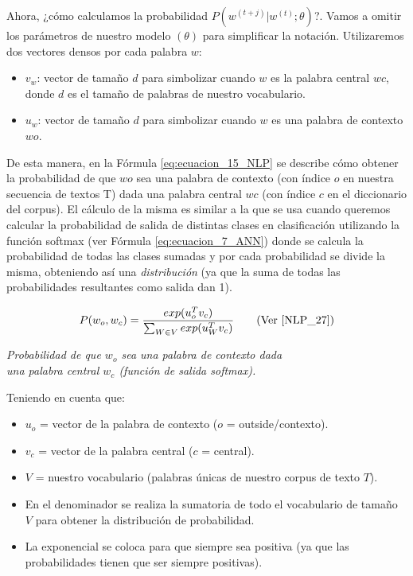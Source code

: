 \documentclass[12pt,a4paper]{article}
\begin{document}
\begin{sloppypar}
Ahora, ¿cómo calculamos la probabilidad $P(w^{(t+j)} | w^{(t)} ; \theta)$?. Vamos a omitir los parámetros de nuestro modelo $(\theta)$ para simplificar la notación. Utilizaremos dos vectores densos por cada palabra $w$:
\begin{itemize}
\item $v_w$: vector de tamaño $d$ para simbolizar cuando $w$ es la palabra central $wc$, donde $d$ es el tamaño de palabras de nuestro vocabulario.
\item $u_w$: vector de tamaño $d$ para simbolizar cuando $w$ es una palabra de contexto $wo$.
\end{itemize}

De esta manera, en la Fórmula \ref{eq:ecuacion_15_NLP} se describe cómo obtener la probabilidad de que $wo$ sea una palabra de contexto (con índice $o$ en nuestra secuencia de textos T) dada una palabra central $wc$ (con índice $c$ en el diccionario del corpus).  El cálculo de la misma es similar a la que se usa cuando queremos calcular la probabilidad de salida de distintas clases en clasificación utilizando la función softmax (ver Fórmula \ref{eq:ecuacion_7_ANN}) donde se calcula la probabilidad de todas las clases sumadas y por cada probabilidad se divide la misma, obteniendo así una \textit{distribución} (ya que la suma de todas las probabilidades resultantes como salida dan 1). 

\begin{equation}\label{eq:ecuacion_15_NLP}
P(w_o, w_c) = \frac{exp(u_{o}^{T} v_c)}{\sum_{W \in V} exp(u_{W}^{T} v_c)}    \qquad \text{(Ver \cite{NLP_27})}
\end{equation}
\begin{center}
\textit{ Probabilidad de que $w_o$ sea una palabra de contexto dada \\ una palabra central $w_c$ (función de salida softmax).}
\end{center}

Teniendo en cuenta que:
\begin{itemize}
\item $u_o$ = vector de la palabra de contexto ($o$ = outside/contexto).
\item $v_c$ = vector de la palabra central ($c$ = central).
\item $V$ = nuestro vocabulario (palabras únicas de nuestro corpus de texto $T$). 
\item En el denominador se realiza la sumatoria de todo el vocabulario de tamaño $V$ para obtener la distribución de probabilidad.
\item La exponencial se coloca para que siempre sea positiva (ya que las probabilidades tienen que ser siempre positivas).
\end{itemize}


\end{sloppypar}
\end{document}
